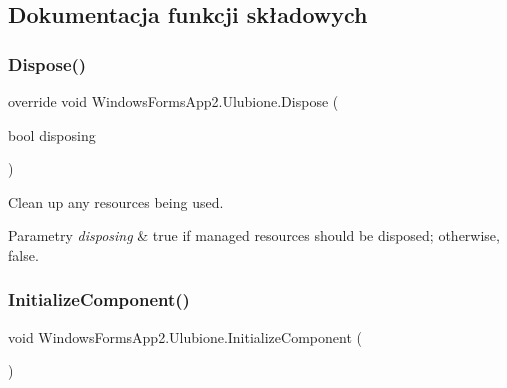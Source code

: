 \subsection{Dokumentacja funkcji składowych}
\mbox{\label{class_windows_forms_app2_1_1_ulubione_a114b27b249c5a38d47009008fbba7ecb}} 
\subsubsection{\texorpdfstring{Dispose()}{Dispose()}}
{\footnotesize\ttfamily override void Windows\+Forms\+App2.\+Ulubione.\+Dispose (\begin{DoxyParamCaption}\item[{bool}]{disposing }\end{DoxyParamCaption})\hspace{0.3cm}{\ttfamily [protected]}}



Clean up any resources being used. 


\begin{DoxyParams}{Parametry}
{\em disposing} & true if managed resources should be disposed; otherwise, false.\\
\hline
\end{DoxyParams}
\mbox{\label{class_windows_forms_app2_1_1_ulubione_a3f4798b6ad5b38e969020d292d104e55}} 
\subsubsection{\texorpdfstring{Initialize\+Component()}{InitializeComponent()}}
{\footnotesize\ttfamily void Windows\+Forms\+App2.\+Ulubione.\+Initialize\+Component (\begin{DoxyParamCaption}{ }\end{DoxyParamCaption})\hspace{0.3cm}{\ttfamily [private]}}



